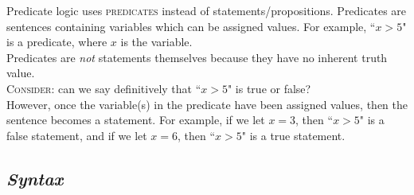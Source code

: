 \documentclass{article}
\begin{document}
Predicate logic uses \textsc{predicates} instead of statements/propositions. Predicates are sentences containing variables which can be assigned values. For example, ``$x>5$" is a predicate, where $x$ is the variable.\\[1ex]
Predicates are \textit{not} statements themselves because they have no inherent truth value.\\
\textsc{Consider}: can we say definitively that ``$x>5$" is true or false?\\[1ex]
However, once the variable(s) in the predicate have been assigned values, then the sentence becomes a statement. For example, if we let $x=3$, then ``$x>5$" is a false statement, and if we let $x=6$, then ``$x>5$" is a true statement.

\subsection{\em Syntax}
\end{document}
